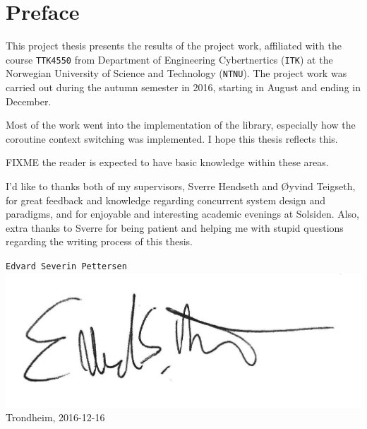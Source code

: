 
\newpage
{}
\section*{Preface}

This project thesis presents the results of the project work, affiliated with the course \texttt{TTK4550} from Department of Engineering Cybertnertics (\texttt{ITK}) at the Norwegian University of Science and Technology (\texttt{NTNU}). The project work was carried out during the autumn semester in 2016, starting in August and ending in December.

Most of the work went into the implementation of the library, especially how the coroutine context switching was implemented. I hope this thesis reflects this.

FIXME the reader is expected to have basic knowledge within these areas.

I'd like to thanks both of my supervisors, Sverre Hendseth and Øyvind Teigseth, for great feedback and knowledge regarding concurrent system design and paradigms, and for enjoyable and interesting academic evenings at Solsiden. Also, extra thanks to Sverre for being patient and helping me with stupid questions regarding the writing process of this thesis.\\[2cm]

\begin{flushright}
\texttt{Edvard Severin Pettersen}\\
\includegraphics[width=0.3\linewidth,right]{fig/signature}
Trondheim, 2016-12-16
\end{flushright}